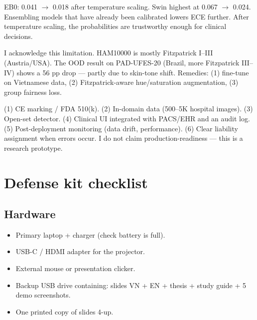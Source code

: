 \documentclass[11pt,a4paper]{article}
\begin{document}
\begin{qa}
EB0: 0.041 $\to$ 0.018 after temperature scaling. Swin highest at 0.067 $\to$ 0.024. Ensembling models that have already been calibrated lowers ECE further. After temperature scaling, the probabilities are trustworthy enough for clinical decisions.
\end{qa}

\begin{qa}
I acknowledge this limitation. HAM10000 is mostly Fitzpatrick I--III (Austria/USA). The OOD result on PAD-UFES-20 (Brazil, more Fitzpatrick III--IV) shows a 56 pp drop --- partly due to skin-tone shift. Remedies: (1) fine-tune on Vietnamese data, (2) Fitzpatrick-aware hue/saturation augmentation, (3) group fairness loss.
\end{qa}

\begin{qa}
(1) CE marking / FDA 510(k). (2) In-domain data (500--5K hospital images). (3) Open-set detector. (4) Clinical UI integrated with PACS/EHR and an audit log. (5) Post-deployment monitoring (data drift, performance). (6) Clear liability assignment when errors occur. I do not claim production-readiness --- this is a research prototype.
\end{qa}

\section{Defense kit checklist}

\subsection{Hardware}
\begin{itemize}[leftmargin=*, itemsep=2pt]
  \item Primary laptop + charger (check battery is full).
  \item USB-C / HDMI adapter for the projector.
  \item External mouse or presentation clicker.
  \item Backup USB drive containing: slides VN + EN + thesis + study guide + 5 demo screenshots.
  \item One printed copy of slides 4-up.
\end{itemize}
\end{document}
